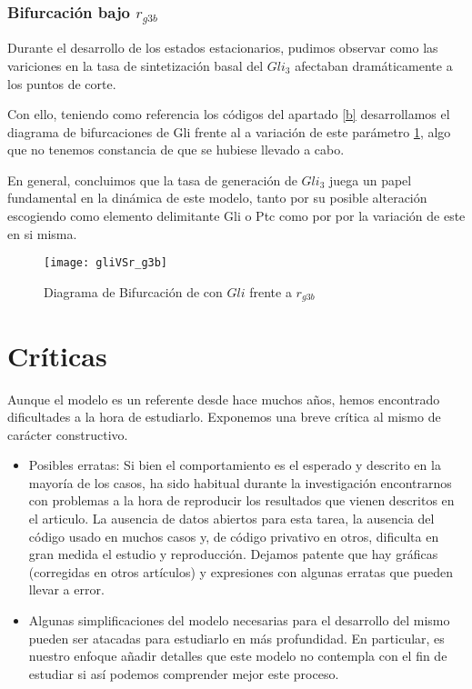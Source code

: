 \subsubsection{Bifurcación bajo $r_{g3b}$}
Durante el desarrollo de los estados estacionarios, pudimos observar como las variciones en la tasa de sintetización basal del $Gli_3$ afectaban dramáticamente a los puntos de corte.

 Con ello, teniendo como referencia los códigos del apartado \ref{b} desarrollamos el diagrama de bifurcaciones de Gli frente al a variación de este parámetro \ref{lai_2}, algo que no tenemos constancia de que se hubiese llevado a cabo.

 En general, concluimos que la tasa de generación de $Gli_3$ juega un papel fundamental en la dinámica de este modelo, tanto por su posible alteración escogiendo como elemento delimitante Gli o Ptc como por por la variación de este en si misma. 
 
\begin{figure}[h]
	\texttt{[image: gliVSr\_g3b]}
	\centering
	\caption{Diagrama de Bifurcación de \cite{schaffer} con $Gli$ frente a $r_{g3b}$}
	\label{lai_2}
\end{figure}

\section{Críticas}
Aunque el modelo es un referente desde hace muchos años, hemos encontrado dificultades a la hora de estudiarlo. Exponemos una breve crítica al mismo de carácter constructivo.
\begin{itemize}
	\item Posibles erratas: Si bien el comportamiento es el esperado y descrito en la mayoría de los casos, ha sido habitual durante la investigación encontrarnos con problemas a la hora de reproducir los resultados que vienen descritos en el articulo. 
	La ausencia de datos abiertos para esta tarea, la ausencia del código usado en muchos casos y, de código privativo en otros, dificulta en gran medida el estudio y reproducción. Dejamos patente que hay gráficas (corregidas en otros artículos) y expresiones con algunas erratas que pueden llevar a error.
	
	\item Algunas simplificaciones del modelo necesarias para el desarrollo del mismo pueden ser atacadas para estudiarlo en más profundidad. En particular, es nuestro enfoque añadir detalles que este modelo no contempla con el fin de estudiar si así podemos comprender mejor este proceso. 
\end{itemize}



